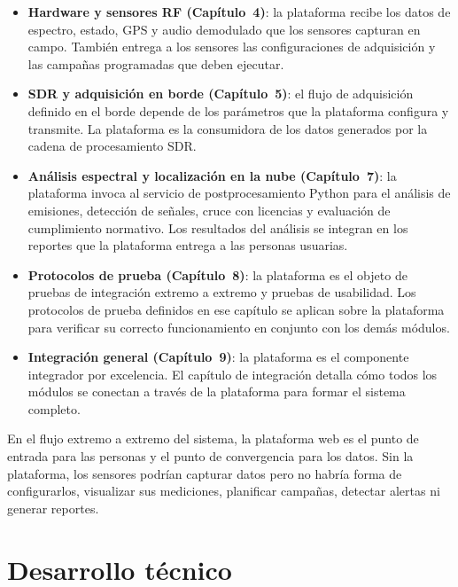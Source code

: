 \begin{itemize}
    \item \textbf{Hardware y sensores RF (Capítulo~4)}: la plataforma recibe
    los datos de espectro, estado, GPS y audio demodulado que los sensores
    capturan en campo. También entrega a los sensores las configuraciones de
    adquisición y las campañas programadas que deben ejecutar.

    \item \textbf{SDR y adquisición en borde (Capítulo~5)}: el flujo de
    adquisición definido en el borde depende de los parámetros que la
    plataforma configura y transmite. La plataforma es la consumidora de los
    datos generados por la cadena de procesamiento SDR.

    \item \textbf{Análisis espectral y localización en la nube (Capítulo~7)}:
    la plataforma invoca al servicio de postprocesamiento Python para el
    análisis de emisiones, detección de señales, cruce con licencias y
    evaluación de cumplimiento normativo. Los resultados del análisis se
    integran en los reportes que la plataforma entrega a las personas usuarias.

    \item \textbf{Protocolos de prueba (Capítulo~8)}: la plataforma es el
    objeto de pruebas de integración extremo a extremo y pruebas de usabilidad.
    Los protocolos de prueba definidos en ese capítulo se aplican sobre la
    plataforma para verificar su correcto funcionamiento en conjunto con los
    demás módulos.

    \item \textbf{Integración general (Capítulo~9)}: la plataforma es el
    componente integrador por excelencia. El capítulo de integración detalla
    cómo todos los módulos se conectan a través de la plataforma para formar
    el sistema completo.
\end{itemize}

En el flujo extremo a extremo del sistema, la plataforma web es el punto de
entrada para las personas y el punto de convergencia para los datos. Sin la
plataforma, los sensores podrían capturar datos pero no habría forma de
configurarlos, visualizar sus mediciones, planificar campañas, detectar
alertas ni generar reportes.

\section{Desarrollo técnico}

